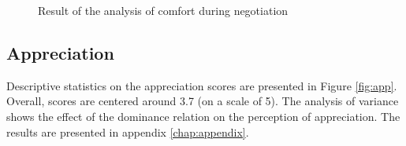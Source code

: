 \documentclass[10pt, a4paper, twocolumn]{article} %
\begin{document}
	\begin{figure}[h]
	
	
	\caption{Result of the analysis of comfort during negotiation}
	\label{tab:confort}
\end{figure}

	\subsection{Appreciation}
		Descriptive statistics on the appreciation scores are presented in Figure \ref{fig:app}. Overall, scores are centered around 3.7 (on a scale of 5). The analysis of variance shows the effect of the dominance relation on the perception of appreciation. The results are presented in appendix \ref{chap:appendix}.
		
\end{document}
